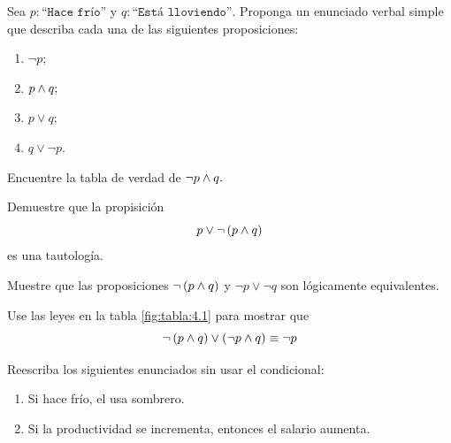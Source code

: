 

 \begin{problema}
  Sea $p:\texttt{``Hace frío''}$ y $q:\texttt{``Está lloviendo''.}$ Proponga un enunciado verbal simple que describa cada una de las siguientes proposiciones:
  \begin{enumerate}
   \item $\neg p;$
   \item $p \wedge q;$
   \item $p \vee q;$
   \item $q \vee \neg p.$
  \end{enumerate}

 \end{problema}




 \begin{problema}
  Encuentre la tabla de verdad de $\neg p \wedge q.$
 \end{problema}




 \begin{problema}
  Demuestre que la propisición 
  $$
  p \vee \neg \left( p\wedge q \right)
  $$ es una tautología.
 \end{problema}




 \begin{problema}
  Muestre que las proposiciones $\neg\left( p \wedge q \right)$ y $\neg p \vee \neg q$ son lógicamente equivalentes.
 \end{problema}




 \begin{problema}
  Use las leyes en la tabla \ref{fig:tabla:4.1} para mostrar que 
  $$
  \neg \left( p \wedge q \right) \vee \left( \neg p \wedge  q \right) \equiv \neg p
  $$
 \end{problema}





 \begin{problema}
  \label{lip:sol:4.6}
  Reescriba los siguientes enunciados sin usar el condicional:
  \begin{enumerate}
   \item Si hace frío, el usa sombrero. 
   \item Si la productividad se incrementa, entonces el salario aumenta.
  \end{enumerate}

 \end{problema}




